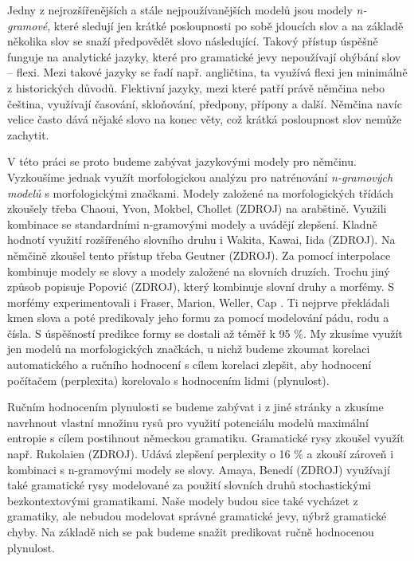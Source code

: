 \documentclass[12pt,a4paper]{report}
\begin{document}
Jedny z nejrozšířenějších a stále nejpoužívanějších modelů jsou modely \textit{n-gramové}, které sledují jen krátké posloupnosti po sobě jdoucích slov a na základě několika slov se snaží předpovědět slovo následující. Takový přístup úspěšně funguje na analytické jazyky, které pro gramatické jevy nepoužívají ohýbání slov -- flexi. Mezi takové jazyky se řadí např. angličtina, ta využívá flexi jen minimálně z historických důvodů. Flektivní jazyky, mezi které patří právě němčina nebo čeština, využívají časování, skloňování, předpony, přípony a další. Němčina navíc velice často dává nějaké slovo na konec věty, což krátká posloupnost slov nemůže zachytit.

V této práci se proto budeme zabývat jazykovými modely pro němčinu. Vyzkoušíme jednak využít morfologickou analýzu pro natrénování \textit{n-gramových modelů} s morfologickými značkami. Modely založené na morfologických třídách zkoušely třeba Chaoui, Yvon, Mokbel, Chollet (ZDROJ) na arabštině. Využili kombinace se standardními n-gramovými modely a uvádějí zlepšení. Kladně hodnotí využití rozšířeného slovního druhu i Wakita, Kawai, Iida (ZDROJ). Na němčině zkoušel tento přístup třeba Geutner (ZDROJ). Za pomocí interpolace kombinuje modely se slovy a modely založené na slovních druzích. Trochu jiný způsob popisuje Popović (ZDROJ), který kombinuje slovní druhy a morfémy. S morfémy experimentovali i Fraser, Marion, Weller, Cap \cite{fraser12}. Ti nejprve překládali kmen slova a poté predikovaly jeho formu za pomocí modelování pádu, rodu a čísla. S úspěšností predikce formy se dostali až téměř k 95 \%. My zkusíme využít jen modelů na morfologických značkách, u nichž budeme zkoumat korelaci automatického a ručního hodnocení s cílem korelaci zlepšit, aby hodnocení počítačem (perplexita) korelovalo s hodnocením lidmi (plynulost).

Ručním hodnocením plynulosti se budeme zabývat i z jiné stránky a zkusíme navrhnout vlastní množinu rysů pro využití potenciálu modelů maximální entropie s cílem postihnout německou gramatiku. Gramatické rysy zkoušel využít např. Rukolaien (ZDROJ). Udává zlepšení perplexity o 16 \% a zkouší zároveň i kombinaci s n-gramovými modely se slovy. Amaya, Benedí (ZDROJ) využívají také gramatické rysy modelované za použití slovních druhů stochastickými bezkontextovými gramatikami. Naše modely budou sice také vycházet z gramatiky, ale nebudou modelovat správné gramatické jevy, nýbrž gramatické chyby. Na základě nich se pak budeme snažit predikovat ručně hodnocenou plynulost.
\end{document}
